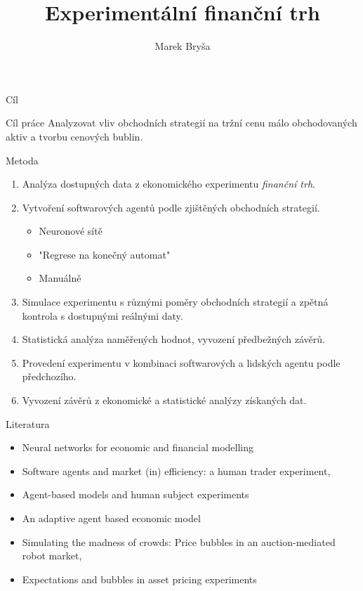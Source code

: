 \documentclass[xcolor=dvipsnames]{beamer}
\title{Experimentální finanční trh}
\author{Marek Bryša}
\institute
{
Masarykova Univerzita\\
Přírodovědecká fakulta
}
\begin{document}
  \frame{\titlepage}
\begin{frame}{Cíl}
	\begin{center}
	\begin{minipage}{10cm}
	\begin{block}{Cíl práce}
	Analyzovat vliv obchodních strategií na tržní cenu málo obchodovaných aktiv a tvorbu cenových bublin.
	\end{block}	
	\end{minipage}
	\end{center}

\end{frame}
\begin{frame}{Metoda}
	\begin{enumerate}
		\item 
			Analýza dostupných data z ekonomického experimentu \emph{finanční trh}.
		\item
			Vytvoření softwarových agentů podle zjištěných obchodních strategií.
			\begin{itemize}
				\item Neuronové sítě
				\item "Regrese na konečný automat"
				\item Manuálně
			\end{itemize}
		 \item
		 	Simulace experimentu s různými poměry obchodních strategií a zpětná kontrola s dostupnými reálnými daty.
		 \item Statistická analýza naměřených hodnot, vyvození předbežných závěrů.
		 \item Provedení experimentu v kombinaci softwarových a lidských agentu podle předchozího.
		 \item Vyvození závěrů z ekonomické a statistické analýzy získaných dat.
	\end{enumerate}
\end{frame}
\begin{frame}{Literatura}
	\begin{itemize}
	
\item Neural networks for economic and financial modelling
\item Software agents and market (in) efficiency: a human trader experiment, 
\item Agent-based models and human subject experiments
\item An adaptive agent based economic model
\item Simulating the madness of crowds: Price bubbles in an auction-mediated robot market,
\item Expectations and bubbles in asset pricing experiments
	\end{itemize}
\end{frame}
\end{document}
